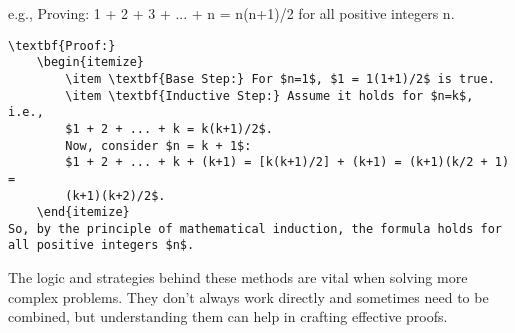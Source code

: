 e.g., Proving: 1 + 2 + 3 + ... + n = n(n+1)/2 for all positive integers n.

\begin{verbatim}
\textbf{Proof:} 
    \begin{itemize}
        \item \textbf{Base Step:} For $n=1$, $1 = 1(1+1)/2$ is true.
        \item \textbf{Inductive Step:} Assume it holds for $n=k$, i.e., 
        $1 + 2 + ... + k = k(k+1)/2$.
        Now, consider $n = k + 1$: 
        $1 + 2 + ... + k + (k+1) = [k(k+1)/2] + (k+1) = (k+1)(k/2 + 1) =
        (k+1)(k+2)/2$.
    \end{itemize}
So, by the principle of mathematical induction, the formula holds for all positive integers $n$.
\end{verbatim}
The logic and strategies behind these methods are vital when solving more complex problems. They don't always work directly and sometimes need to be combined, but understanding them can help in crafting effective proofs.

